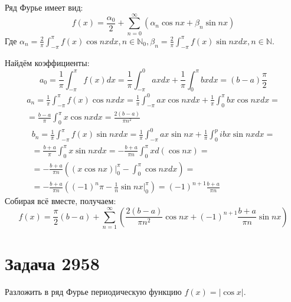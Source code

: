 \documentclass[11pt]{article}
\begin{document}
Ряд Фурье имеет вид:
$$f(x) = \frac{\alpha_0}2 + \sum_{n = 0}^\infty(\alpha_n\cos nx + \beta_n\sin nx)$$
Где \(\alpha_n = \frac{2}\pi\int_{-\pi}^\pi f(x)\cos nxdx, n \in \mathbb{N}_0,
\beta_n = \frac{2}\pi\int_{-\pi}^\pi f(x)\sin nxdx, n \in \mathbb{N}\).

Найдём коэффициенты:
$$a_0 = \frac{1}\pi\int_{-\pi}^\pi f(x)dx = \frac{1}\pi\int_{-\pi}^0 axdx + \frac{1}\pi\int_0^\pi bxdx = (b - a)\frac{\pi}2$$
\begin{multline*}
a_n = \frac{1}\pi\int_{-\pi}^\pi f(x)\cos nx dx = \frac{1}\pi\int_{-\pi}^0 ax\cos nxdx + \frac{1}\pi\int_0^\pi bx\cos nxdx = \\
 = \frac{b - a}\pi\int_0^\pi x\cos nx dx = \frac{2(b - a)}{\pi n^2}
\end{multline*}
\begin{multline*}
b_n = \frac{1}\pi\int_{-\pi}^\pi f(x)\sin nx dx = \frac{1}\pi\int_{-\pi}^0 ax\sin nx + \frac{1}\pi\int_0^pi bx\sin nx dx = \\
 = \frac{b + a}\pi\int_0^\pi x\sin nx dx = -\frac{b + a}{\pi n}\int_0^\pi xd(\cos nx) = \\
 = -\frac{b + a}{\pi n}\left((x\cos nx)\bigg|_0^\pi - \int_0^\pi\cos nxdx\right) = \\
 = -\frac{b+a}{\pi n}\left((-1)^n\pi - \frac{1}n\sin nx\bigg|_0^\pi\right) = (-1)^{n+1}\frac{b+a}{\pi n}
\end{multline*}
Собирая всё вместе, получаем:
$$f(x) = \frac{\pi}2(b - a) + \sum_{n = 1}^\infty\left(\frac{2(b - a)}{\pi n^2}\cos nx + (-1)^{n + 1}\frac{b+a}{\pi n}\sin nx\right)$$
\section{Задача 2958}
\label{sec:orgf9ed520}
Разложить в ряд Фурье периодическую функцию \(f(x) = |\cos x|\).
\end{document}
